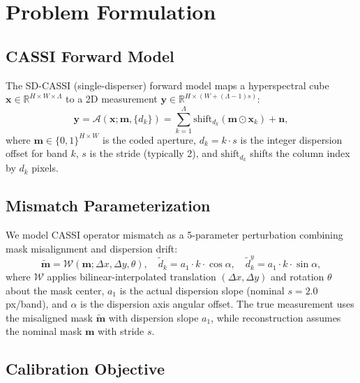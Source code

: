 \documentclass[runningheads]{llncs}
\begin{document}
\section{Problem Formulation}
\label{sec:formulation}

\subsection{CASSI Forward Model}

The SD-CASSI (single-disperser) forward model maps a hyperspectral cube $\mathbf{x} \in \mathbb{R}^{H \times W \times \Lambda}$ to a 2D measurement $\mathbf{y} \in \mathbb{R}^{H \times (W + (\Lambda-1)s)}$:
\begin{equation}
\label{eq:forward}
    \mathbf{y} = \mathcal{A}(\mathbf{x}; \mathbf{m}, \{d_k\}) = \sum_{k=1}^{\Lambda} \text{shift}_{d_k}(\mathbf{m} \odot \mathbf{x}_k) + \mathbf{n},
\end{equation}
where $\mathbf{m} \in \{0,1\}^{H \times W}$ is the coded aperture, $d_k = k \cdot s$ is the integer dispersion offset for band $k$, $s$ is the stride (typically 2), and $\text{shift}_{d_k}$ shifts the column index by $d_k$ pixels.

\subsection{Mismatch Parameterization}

We model CASSI operator mismatch as a 5-parameter perturbation combining mask misalignment and dispersion drift:
\begin{equation}
\label{eq:mismatch}
    \tilde{\mathbf{m}} = \mathcal{W}(\mathbf{m}; \Delta x, \Delta y, \theta), \quad \tilde{d}_k = a_1 \cdot k \cdot \cos\alpha, \quad \tilde{d}_k^y = a_1 \cdot k \cdot \sin\alpha,
\end{equation}
where $\mathcal{W}$ applies bilinear-interpolated translation $(\Delta x, \Delta y)$ and rotation $\theta$ about the mask center, $a_1$ is the actual dispersion slope (nominal $s = 2.0$\,px/band), and $\alpha$ is the dispersion axis angular offset.
The true measurement uses the misaligned mask $\tilde{\mathbf{m}}$ with dispersion slope $a_1$, while reconstruction assumes the nominal mask $\mathbf{m}$ with stride $s$.

\subsection{Calibration Objective}
\end{document}
